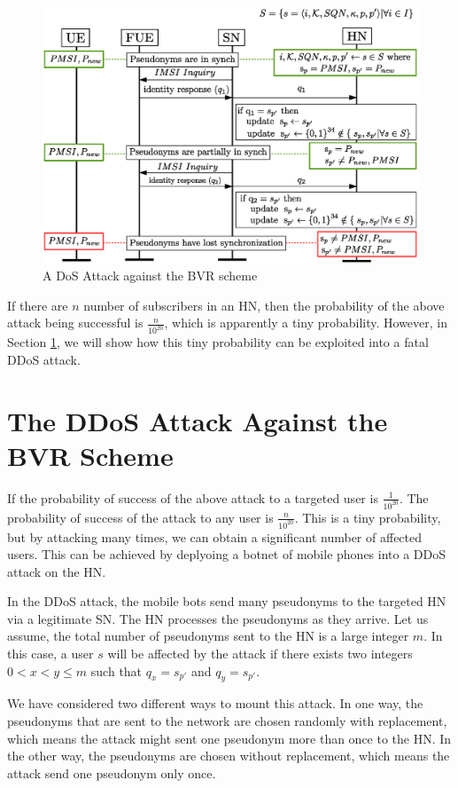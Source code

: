 \documentclass{llncs} %
\begin{document}
\begin{figure}[]
  \centering
    \includegraphics[width=\textwidth]{DDoS.eps}
  \caption{A DoS Attack against the BVR scheme}
  \label{fig:dos_attack}	
\end{figure}

If there are $n$ number of subscribers in an HN, then the probability of the above attack being successful is $\frac{n}{10^{20}}$, which is apparently a tiny probability. However, in Section \ref{sec:ddos_attack}, we will show how this tiny probability can be exploited into a fatal DDoS attack.

\section{The DDoS Attack Against the BVR Scheme} \label{sec:ddos_attack}
If the probability of success of the above attack to a targeted user is $\frac{1}{10^{20}}$. The probability of success of the attack to any user is $\frac{n}{10^{20}}$. This is a tiny probability, but by attacking many times, we can obtain a significant number of affected users. This can be achieved by deplyoing a botnet of mobile phones into a DDoS attack on the HN.

In the DDoS attack, the mobile bots send many pseudonyms to the targeted HN via a legitimate SN. The HN processes the pseudonyms as they arrive. Let us assume, the total number of pseudonyms sent to the HN is a large integer $m$. In this case, a user $s$ will be affected by the attack if there exists two integers $0 < x < y \leq m$ such that $q_{x} = s_{p'}$ and $q_{y} = s_{p'}$.

We have considered two different ways to mount this attack. In one way, the pseudonyms that are sent to the network are chosen randomly with replacement, which means the attack might sent one pseudonym more than once to the HN. In the other way, the pseudonyms are chosen without replacement, which means the attack send one pseudonym only once.
\end{document}
